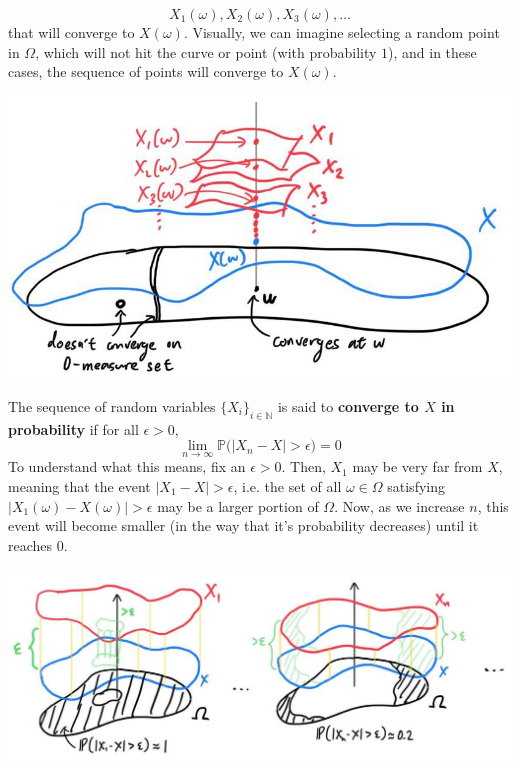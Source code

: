 \begin{definition}
\begin{equation}
      X_1 (\omega), X_2 (\omega), X_3 (\omega), \ldots
    \end{equation}
    that will converge to $X(\omega)$. Visually, we can imagine selecting a random point in $\Omega$, which will not hit the curve or point (with probability $1$), and in these cases, the sequence of points will converge to $X(\omega)$. 
    \begin{center}
      \includegraphics[scale=0.3]{img/almost_sure_convergence_2.jpg}
    \end{center}
  \end{definition}

  \begin{definition}
    The sequence of random variables $\{ X_i\}_{i \in \mathbb{N}}$ is said to \textbf{converge to $X$ in probability} if for all $\epsilon > 0$, 
    \begin{equation}
      \lim_{n \rightarrow \infty} \mathbb{P} \big( |X_n - X| > \epsilon \big) = 0
    \end{equation}
    To understand what this means, fix an $\epsilon > 0$. Then, $X_1$ may be very far from $X$, meaning that the event $|X_1 - X| > \epsilon$, i.e. the set of all $\omega \in \Omega$ satisfying $|X_1(\omega) - X (\omega)| > \epsilon$ may be a larger portion of $\Omega$. Now, as we increase $n$, this event will become smaller (in the way that it's probability decreases) until it reaches $0$. 
    \begin{center}
      \includegraphics[scale=0.3]{img/convergence_in_probability.jpg}
    \end{center}
  \end{definition}


